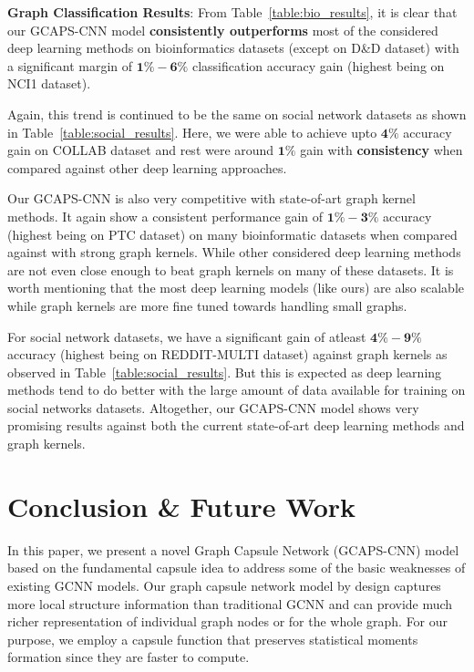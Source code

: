 \documentclass{article}
\begin{document}
\noindent \textbf{Graph Classification Results}: From Table~\ref{table:bio_results}, it is   clear that our GCAPS-CNN  model \textbf{consistently outperforms}  most of the considered deep learning methods on       bioinformatics datasets (except on   D\&D dataset)   with a significant margin of $\mathbf{1\textbf{\%}-6\textbf{\%}}$ classification accuracy gain (highest   being on NCI1 dataset). 

Again, this trend is continued to be the same on   social network datasets as shown in Table~\ref{table:social_results}.  Here, we were able to achieve upto  $\mathbf{4\textbf{\%}}$ accuracy gain on COLLAB dataset and rest were around $\mathbf{1\textbf{\%}}$ gain   with \textbf{consistency} when compared against other deep learning approaches.

Our GCAPS-CNN is also very competitive with state-of-art graph kernel methods. It again  show a consistent performance gain of   $\mathbf{1\textbf{\%}-3\textbf{\%}}$ accuracy  (highest being on PTC dataset)  on many bioinformatic datasets when compared against with strong graph kernels.  While other considered deep learning methods are   not even close enough to  beat graph kernels on many of these  datasets. It is worth mentioning that the most deep learning models (like ours) are also scalable     while graph kernels are more fine tuned towards handling small graphs.  

For social network datasets, we have a significant gain of atleast $\mathbf{4\textbf{\%}-9\textbf{\%}}$ accuracy (highest being on REDDIT-MULTI dataset) against graph kernels as observed in  Table~\ref{table:social_results}. But this is expected as deep learning methods tend to do better with the large amount of data available for training on social networks datasets. Altogether, our GCAPS-CNN model shows very promising results against both  the current state-of-art  deep learning methods and graph kernels.  








\section{Conclusion \& Future Work }

In this paper, we present a novel    Graph Capsule Network (GCAPS-CNN)  model based on the fundamental capsule idea to address some of the basic weaknesses of existing GCNN models. Our graph capsule network model by design   captures more local structure information than traditional GCNN and can   provide much richer representation of individual graph nodes or for the whole graph. For our purpose, we employ a capsule function that preserves statistical moments formation  since they are faster to compute. 
\end{document}
